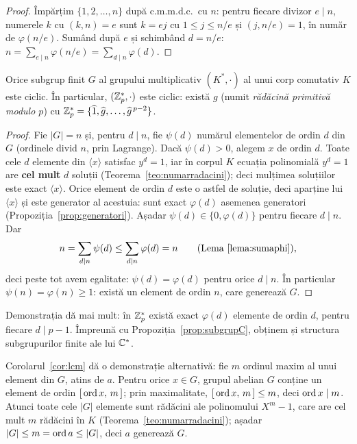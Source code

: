 \begin{proof}
Împărțim $\{1,2,\dots,n\}$ după c.m.m.d.c.\ cu $n$: pentru fiecare divizor $e\mid n$, numerele $k$ cu $(k,n)=e$ sunt $k=ej$ cu $1\le j\le n/e$ și $(j,n/e)=1$, în număr de $\varphi(n/e)$. Sumând după $e$ și schimbând $d=n/e$: $n=\sum_{e\mid n}\varphi(n/e)=\sum_{d\mid n}\varphi(d)$.
\end{proof}

\begin{teorema}\label{teo:ciclicitate}
Orice subgrup finit $G$ al grupului multiplicativ $(K^*,\cdot)$ al unui corp comutativ $K$ este ciclic. În particular, $(\mathbb{Z}_p^*,\cdot)$ este ciclic: există $g$ (numit \emph{rădăcină primitivă modulo $p$}) cu $\mathbb{Z}_p^*=\{\widehat{1},\widehat{g},\dots,\widehat{g}^{\,p-2}\}$.
\end{teorema}

\begin{proof}
Fie $|G|=n$ și, pentru $d\mid n$, fie $\psi(d)$ numărul elementelor de ordin $d$ din $G$ (ordinele divid $n$, prin Lagrange). Dacă $\psi(d)>0$, alegem $x$ de ordin $d$. Toate cele $d$ elemente din $\langle x\rangle$ satisfac $y^d=1$, iar în corpul $K$ ecuația polinomială $y^d=1$ are \textbf{cel mult} $d$ soluții (Teorema~\ref{teo:numarradacini}); deci mulțimea soluțiilor este exact $\langle x\rangle$. Orice element de ordin $d$ este o astfel de soluție, deci aparține lui $\langle x\rangle$ și este generator al acestuia: sunt exact $\varphi(d)$ asemenea generatori (Propoziția~\ref{prop:generatori}). Așadar $\psi(d)\in\{0,\varphi(d)\}$ pentru fiecare $d\mid n$. Dar
\[
n=\sum_{d\mid n}\psi(d)\le\sum_{d\mid n}\varphi(d)=n\qquad(\text{Lema~\ref{lema:sumaphi}}),
\]
deci peste tot avem egalitate: $\psi(d)=\varphi(d)$ pentru orice $d\mid n$. În particular $\psi(n)=\varphi(n)\ge1$: există un element de ordin $n$, care generează $G$.
\end{proof}

\begin{observatie}
Demonstrația dă mai mult: în $\mathbb{Z}_p^*$ există exact $\varphi(d)$ elemente de ordin $d$, pentru fiecare $d\mid p-1$. Împreună cu Propoziția~\ref{prop:subgrupC}, obținem și structura subgrupurilor finite ale lui $\mathbb{C}^*$.
\end{observatie}

\begin{observatie}
Corolarul~\ref{cor:lcm} dă o demonstrație alternativă: fie $m$ ordinul maxim al unui element din $G$, atins de $a$. Pentru orice $x\in G$, grupul abelian $G$ conține un element de ordin $[\,\operatorname{ord} x,\,m\,]$; prin maximalitate, $[\,\operatorname{ord} x,\,m\,]\le m$, deci $\operatorname{ord} x\mid m$. Atunci toate cele $|G|$ elemente sunt rădăcini ale polinomului $X^m-1$, care are cel mult $m$ rădăcini în $K$ (Teorema~\ref{teo:numarradacini}); așadar $|G|\le m=\operatorname{ord} a\le|G|$, deci $a$ generează $G$.
\end{observatie}


